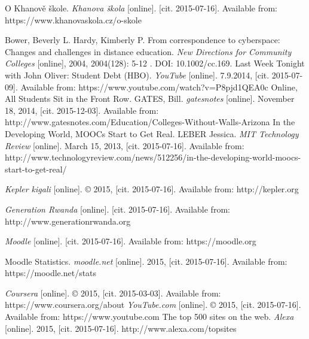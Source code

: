 
\def\bibname{Bibliography}
\begin{thebibliography}{99}
\addcontentsline{toc}{chapter}{\bibname}


O Khanově škole. \emph{Khanova škola} [online]. [cit. 2015-07-16]. Available from: https://www.khanovaskola.cz/o-skole



{\sc Bower,} Beverly L. {\sc Hardy,} Kimberly P.
From correspondence to cyberspace: Changes and challenges in distance education.
\emph{New Directions for Community Colleges} [online], 2004, 2004(128): 5-12 . DOI: 10.1002/cc.169.
Last Week Tonight with John Oliver: Student Debt (HBO). \emph{YouTube} [online]. 7.9.2014, [cit. 2015-07-09]. Available from: https://www.youtube.com/watch?v=P8pjd1QEA0c
Online, All Students Sit in the Front Row. GATES, Bill. \emph{gatesnotes} [online]. November 18, 2014, [cit. 2015-12-03]. Available from: http://www.gatesnotes.com/Education/Colleges-Without-Walls-Arizona
In the Developing World, MOOCs Start to Get Real. LEBER Jessica. \emph{MIT Technology Review} [online]. March 15, 2013, [cit. 2015-07-16]. Available from: http://www.technologyreview.com/news/512256/in-the-developing-world-moocs-start-to-get-real/

\emph{Kepler kigali} [online]. © 2015, [cit. 2015-07-16]. Available from: http://kepler.org

\emph{Generation Rwanda} [online]. [cit. 2015-07-16]. Available from: http://www.generationrwanda.org

\emph{Moodle} [online]. [cit. 2015-07-16]. Available from: https://moodle.org

Moodle Statistics. \emph{moodle.net} [online]. 2015, [cit. 2015-07-16]. Available from: https://moodle.net/stats


\emph{Coursera} [online]. © 2015, [cit. 2015-03-03]. Available from: https://www.coursera.org/about
\emph{YouTube.com} [online]. © 2015, [cit. 2015-07-16]. Available from: https://www.youtube.com
The top 500 sites on the web. \emph{Alexa} [online]. 2015, [cit. 2015-07-16]. http://www.alexa.com/topsites


\end{thebibliography}
